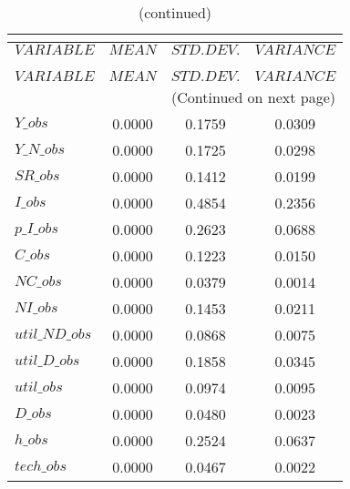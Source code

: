  
\begin{center}
\begin{longtable}{lccc} 
\caption{THEORETICAL MOMENTS}\\
 \label{Table:th_moments}\\
\toprule 
$VARIABLE       $	 & 	 $         MEAN$	 & 	 $    STD. DEV.$	 & 	 $     VARIANCE$\\
\midrule \endfirsthead 
\caption{(continued)}\\
 \toprule \\ 
$VARIABLE       $	 & 	 $         MEAN$	 & 	 $    STD. DEV.$	 & 	 $     VARIANCE$\\
\midrule \endhead 
\midrule \multicolumn{4}{r}{(Continued on next page)} \\ \bottomrule \endfoot 
\bottomrule \endlastfoot 
$Y\_obs         $	 & 	       0.0000	 & 	       0.1759	 & 	       0.0309 \\ 
$Y\_N\_obs      $	 & 	       0.0000	 & 	       0.1725	 & 	       0.0298 \\ 
$SR\_obs        $	 & 	       0.0000	 & 	       0.1412	 & 	       0.0199 \\ 
$I\_obs         $	 & 	       0.0000	 & 	       0.4854	 & 	       0.2356 \\ 
$p\_I\_obs      $	 & 	       0.0000	 & 	       0.2623	 & 	       0.0688 \\ 
$C\_obs         $	 & 	       0.0000	 & 	       0.1223	 & 	       0.0150 \\ 
$NC\_obs        $	 & 	       0.0000	 & 	       0.0379	 & 	       0.0014 \\ 
$NI\_obs        $	 & 	       0.0000	 & 	       0.1453	 & 	       0.0211 \\ 
$util\_ND\_obs  $	 & 	       0.0000	 & 	       0.0868	 & 	       0.0075 \\ 
$util\_D\_obs   $	 & 	       0.0000	 & 	       0.1858	 & 	       0.0345 \\ 
$util\_obs      $	 & 	       0.0000	 & 	       0.0974	 & 	       0.0095 \\ 
$D\_obs         $	 & 	       0.0000	 & 	       0.0480	 & 	       0.0023 \\ 
$h\_obs         $	 & 	       0.0000	 & 	       0.2524	 & 	       0.0637 \\ 
$tech\_obs      $	 & 	       0.0000	 & 	       0.0467	 & 	       0.0022 \\ 
\end{longtable}
 \end{center}
